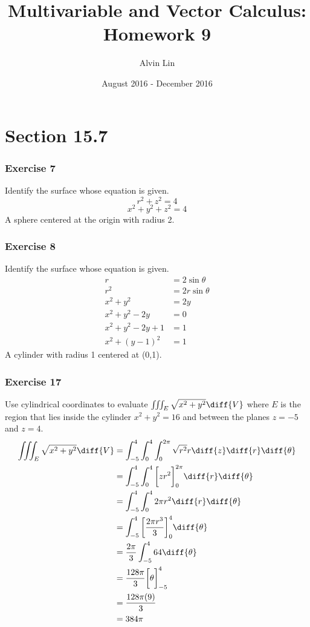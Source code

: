 \documentclass{math}
\title{Multivariable and Vector Calculus: Homework 9}
\author{Alvin Lin}
\date{August 2016 - December 2016}
\begin{document}
\maketitle

\section*{Section 15.7}

\subsubsection*{Exercise 7}
Identify the surface whose equation is given.
\[ r^2+z^2 = 4 \]
\[ x^2+y^2+z^2 = 4 \]
A sphere centered at the origin with radius 2.

\subsubsection*{Exercise 8}
Identify the surface whose equation is given.
\begin{align*}
  r &= 2\sin\theta \\
  r^2 &= 2r\sin\theta \\
  x^2+y^2 &= 2y \\
  x^2+y^2-2y &= 0 \\
  x^2+y^2-2y+1 &= 1 \\
  x^2+(y-1)^2 &= 1
\end{align*}
A cylinder with radius 1 centered at (0,1).

\subsubsection*{Exercise 17}
Use cylindrical coordinates to evaluate \( \iiint_{E}\sqrt{x^2+y^2}\diff{V} \)
where \( E \) is the region that lies inside the cylinder \( x^2+y^2 = 16 \) and
between the planes \( z = -5 \) and \( z = 4 \).
\begin{align*}
  \iiint_{E}\sqrt{x^2+y^2}\diff{V} &=
    \int_{-5}^{4}\int_{0}^{4}\int_{0}^{2\pi}\sqrt{r^2}r
    \diff{z}\diff{r}\diff{\theta} \\
  &= \int_{-5}^{4}\int_{0}^{4}\bigg[zr^2\bigg]_{0}^{2\pi}
    \diff{r}\diff{\theta} \\
  &= \int_{-5}^{4}\int_{0}^{4}2\pi r^2\diff{r}\diff{\theta} \\
  &= \int_{-5}^{4}\bigg[\frac{2\pi r^3}{3}\bigg]_{0}^{4}\diff{\theta} \\
  &= \frac{2\pi}{3}\int_{-5}^{4}64\diff{\theta} \\
  &= \frac{128\pi}{3}\bigg[\theta\bigg]_{-5}^{4} \\
  &= \frac{128\pi(9)}{3} \\
  &= 384\pi
\end{align*}
\end{document}
